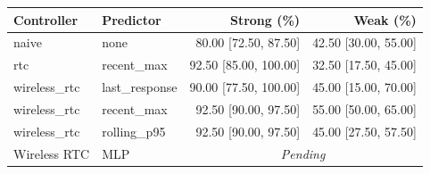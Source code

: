 \begin{tabular}{llrr}
\toprule
Controller & Predictor & Strong (\%) & Weak (\%) \\
\midrule
naive & none & 80.00 [72.50, 87.50] & 42.50 [30.00, 55.00] \\
rtc & recent\_max & 92.50 [85.00, 100.00] & 32.50 [17.50, 45.00] \\
wireless\_rtc & last\_response & 90.00 [77.50, 100.00] & 45.00 [15.00, 70.00] \\
wireless\_rtc & recent\_max & 92.50 [90.00, 97.50] & 55.00 [50.00, 65.00] \\
wireless\_rtc & rolling\_p95 & 92.50 [90.00, 97.50] & 45.00 [27.50, 57.50] \\
Wireless RTC & MLP & \multicolumn{2}{c}{\textit{Pending}} \\
\bottomrule
\end{tabular}
